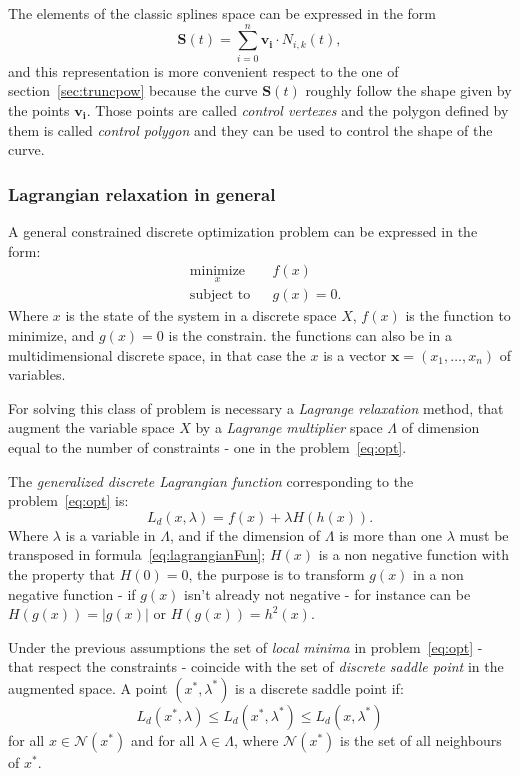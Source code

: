 \documentclass[a4paper]{article}
\begin{document}
The elements of the classic splines space can be expressed in the form
$$
\mathbf{S}(t)=\sum_{i=0}^n\mathbf{v_i}\cdot N_{i,k}(t),
$$
and this representation is more convenient respect to the one of
section~\ref{sec:truncpow} because the curve $\mathbf{S}(t)$ roughly
follow the shape given by the points $\mathbf{v_i}$. Those points are
called \emph{control vertexes} and the polygon defined by them is
called \emph{control polygon} and they can be used to control the
shape of the curve.

\subsubsection{Lagrangian relaxation in general}
A general constrained discrete optimization problem can be expressed in
the form:
\begin{equation}\label{eq:opt}
\begin{aligned}
& \underset{x}{\text{minimize}}
& & f(x) \\
& \text{subject to}
& & g(x)=0.
\end{aligned}
\end{equation}
Where $x$ is the state of the system in a discrete space $X$, $f(x)$
is the function to
minimize, and $g(x)=0$ is the constrain. the functions can also be
in a multidimensional discrete space, in that case the $x$ is a vector
$\mathbf{x}=(x_1,\dots,x_n)$ of variables.

For solving this class
of problem is necessary a \emph{Lagrange relaxation} method, that
augment the variable space $X$ by a \emph{Lagrange multiplier} space
$\Lambda$ of dimension equal to the number of constraints - one in the
problem~\eqref{eq:opt}.

The \emph{generalized discrete Lagrangian
  function} corresponding to the problem~\eqref{eq:opt} is:
\begin{equation}\label{eq:lagrangianFun}
  L_d(x,\lambda)=f(x)+\lambda H(h(x)).
\end{equation}
Where $\lambda$ is a variable in $\Lambda$, and if the dimension of
$\Lambda$ is more than one $\lambda$ must be transposed in
formula~\eqref{eq:lagrangianFun}; $H(x)$ is a non negative function
with the property that $H(0)=0$, the purpose is to transform $g(x)$ in
a non negative function - if $g(x)$ isn't already not negative - for
instance can be $H(g(x))=|g(x)|$ or $H(g(x))=h^2(x)$.

Under the previous assumptions the set of \emph{local minima}
in problem~\eqref{eq:opt} - that respect the constraints -  coincide
with the set of \emph{discrete saddle point}
in the augmented space. A point $(x^*,\lambda^*)$ is a discrete saddle
point if:
\begin{equation*}
  L_d(x^*,\lambda)\leq L_d(x^*,\lambda^*)\leq L_d(x,\lambda^*)
\end{equation*}
for all $x\in\mathcal{N}(x^*)$ and for all $\lambda\in\Lambda$, where
$\mathcal{N}(x^*)$ is the set of all neighbours of $x^*$.
\end{document}
